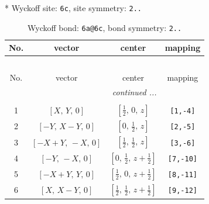 \documentclass[fleqn,8pt]{jsarticle}
\begin{document}
* Wyckoff site: {\tt 6c}, site symmetry: {\tt 2..}
\renewcommand{\arraystretch}{1.2}
\begin{longtable}{cccc}
\caption{Wyckoff bond: {\tt 6a@6c}, bond symmetry: {\tt 2..}}
 \\
 \hline \hline
No. & vector & center & mapping \\ \hline \endfirsthead

\multicolumn{3}{l}{\tablename\ \thetable{}} \\
 \hline \hline
No. & vector & center & mapping \\ \hline \endhead

 \hline \hline
\multicolumn{3}{r}{\footnotesize\it continued ...} \\ \endfoot

 \hline \hline
\multicolumn{3}{r}{} \\ \endlastfoot

1 & $\left[ X,\, Y,\, 0 \right]$ & $\left[ \frac{1}{2},\, 0,\, z \right]$ & {\tt [1,-4]} \\ \hline
2 & $\left[ - Y,\, X - Y,\, 0 \right]$ & $\left[ 0,\, \frac{1}{2},\, z \right]$ & {\tt [2,-5]} \\ \hline
3 & $\left[ - X + Y,\, - X,\, 0 \right]$ & $\left[ \frac{1}{2},\, \frac{1}{2},\, z \right]$ & {\tt [3,-6]} \\ \hline
4 & $\left[ - Y,\, - X,\, 0 \right]$ & $\left[ 0,\, \frac{1}{2},\, z + \frac{1}{2} \right]$ & {\tt [7,-10]} \\ \hline
5 & $\left[ - X + Y,\, Y,\, 0 \right]$ & $\left[ \frac{1}{2},\, 0,\, z + \frac{1}{2} \right]$ & {\tt [8,-11]} \\ \hline
6 & $\left[ X,\, X - Y,\, 0 \right]$ & $\left[ \frac{1}{2},\, \frac{1}{2},\, z + \frac{1}{2} \right]$ & {\tt [9,-12]} \\
\end{longtable}
\renewcommand{\arraystretch}{1.2}
\end{document}
